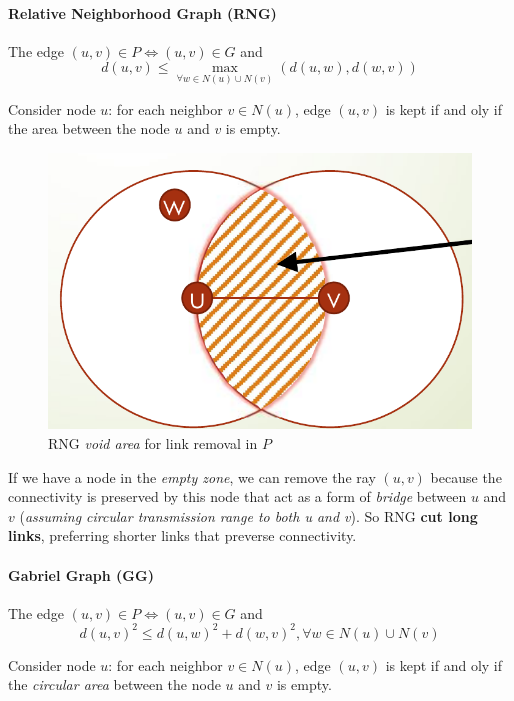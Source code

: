 \documentclass[10pt,a4paper]{report}
\theoremstyle{definition}
\begin{document}
\paragraph{Relative Neighborhood Graph (RNG)}
\label{sec:relative-neighborhood-graph}
The edge $(u,v) \in P \iff  (u,v) \in G$
and
\begin{equation}
	d(u,v) \leq \max_{\forall w \in N(u)\cup N(v)}(d(u,w),d(w,v))
\end{equation}

Consider node $u$: for each neighbor $v \in N(u)$, edge $(u,v)$ is kept if and oly if the area between the node $u$ and $v$ is empty.
\begin{figure}[h]
	\centering\includegraphics[scale=0.20]{images/Pasted image 20230523153320.png}
	\caption{RNG \textit{void area} for link removal in $P$}
\end{figure}


If we have a node in the \textit{empty zone}, we can remove the ray $(u,v)$ because the connectivity is preserved by this node that act as a form of \textit{bridge} between $u$ and $v$ (\textit{assuming circular transmission range to both u and v}). So RNG \textbf{cut long links}, preferring shorter links that preverse connectivity.
\paragraph{Gabriel Graph (GG)}\label{sec:gabriel-graph}
The edge $(u,v) \in P \iff  (u,v) \in G$
and
\begin{equation}
	d(u,v)^{2} \leq d(u,w)^{2}+d(w,v)^{2}, \forall w \in N(u) \cup N(v)
\end{equation}

Consider node $u$: for each neighbor $v \in N(u)$, edge $(u,v)$ is kept if and oly if the \textit{circular area} between the node $u$ and $v$ is empty.
\end{document}
